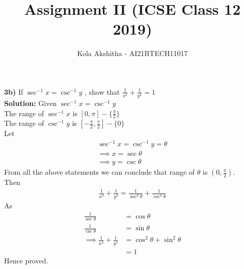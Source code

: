 \documentclass[journal,12pt,twocolumn]{IEEEtran}
\title{Assignment II (ICSE Class 12 2019)}
\author{Kola Akshitha - AI21BTECH11017}
\begin{document}
\maketitle
\textbf{3b)} 
If $\sec^{-1}x = \csc^{-1}y$ , show that $\frac{1}{x^{2}}+\frac{1}{y^{2}} = 1$
\\
\textbf{Solution:}
 Given $\sec^{-1}x = \csc^{-1}y$\\
 The range of $\sec^{-1}x$ is $[0,\pi]-\lbrace\frac{\pi}{2}\rbrace$ \\
 The range of $\csc^{-1}y$ is $[-\frac{\pi}{2},\frac{\pi}{2}]-\lbrace0\rbrace$ \\
 Let  
\begin{align} 
 \sec^{-1}x = \csc^{-1}y = \theta \nonumber
 \\
\implies x = \sec\theta 
 \\
\implies y = \csc\theta 
 \end{align}
 From all the above statements we can conclude that range of $\theta$ is $\left(0,\frac{\pi}{2}\right).$ \\
 Then
 \begin{align}
 \frac{1}{x^{2}}+\frac{1}{y^{2}} = \frac{1}{\sec^{2}\theta}+\frac{1}{\csc^{2}\theta}
 \end{align}
 As
 \begin{align}
  \frac{1}{\sec\theta}&=\cos\theta \nonumber
  \\
   \frac{1}{\csc\theta}&=\sin\theta \nonumber
 \\
\implies \frac{1}{x^{2}}+\frac{1}{y^{2}}&=\cos^{2}\theta+\sin^{2}\theta
\\
&=1 \nonumber
 \end{align}
 Hence proved.
 
\end{document}
